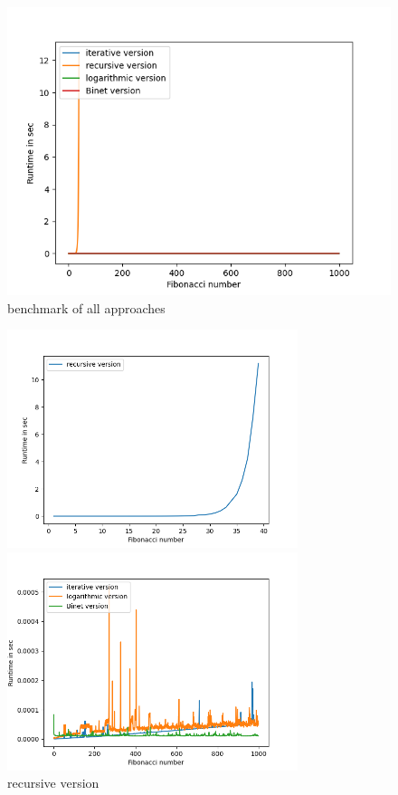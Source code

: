 \documentclass{article}
\begin{document}
\begin{flushleft}
\begin{enumerate}[(a)]
\begin{figure}[H]
        \includegraphics{benchmarking.png}
        \caption{benchmark of all approaches}
    \end{figure}
    \begin{figure}
        \centering
        \begin{minipage}{0.48\textwidth}
        \includegraphics[width=8.5cm]{recursive_only.png}
        \caption{recursive version}
        \end{minipage}
        \centering
        \begin{minipage}{0.48\textwidth}
        \centering
        \includegraphics[width=8.5cm]{no_recursive.png}

\end{minipage}
\end{figure}
\end{enumerate}
\end{flushleft}
\end{document}
